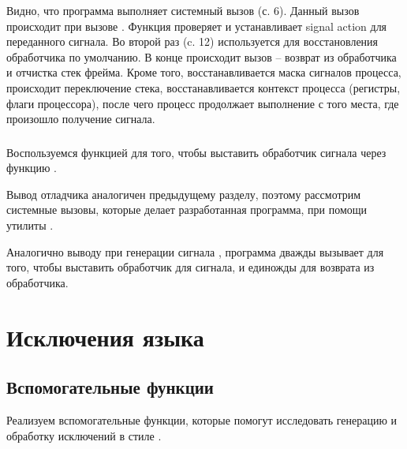 
Видно, что программа выполняет системный вызов  (с. 6). Данный вызов происходит при вызове . Функция проверяет и устанавливает signal action для переданного сигнала. Во второй раз  (c. 12) используется для восстановления обработчика по умолчанию. В конце происходит вызов  -- возврат из обработчика и отчистка стек фрейма. Кроме того, восстанавливается маска сигналов процесса, происходит переключение стека, восстанавливается контекст процесса (регистры, флаги процессора), после чего процесс продолжает выполнение с того места, где произошло получение сигнала.

\subsubsection{}

Воспользуемся функцией  для того, чтобы выставить обработчик сигнала  через функцию .


Вывод отладчика  аналогичен предыдущему разделу, поэтому рассмотрим системные вызовы, которые делает разработанная программа, при помощи утилиты .


Аналогично выводу  при генерации сигнала , программа дважды вызывает  для того, чтобы выставить обработчик для сигнала, и единожды  для возврата из обработчика.

\section{Исключения языка }

\subsection{Вспомогательные функции}

Реализуем вспомогательные функции, которые помогут исследовать генерацию и обработку исключений в стиле .






